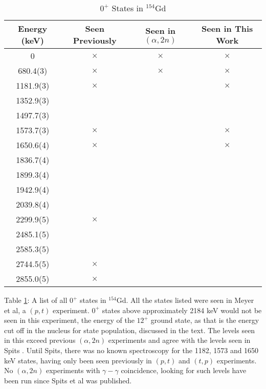 \begin{table}
    \centering
    \begin{ThreePartTable}
        \caption{$0^+$ States in $^{154}$Gd}
        \label{tab:0plus_154}
    \begin{tabular}{c|c|c|c}
        Energy (keV) & Seen Previously \citep{meyer06:_zeroplus} & Seen in $(\alpha,2n)$ & Seen in This Work  \\
        \toprule
        0 & $\times$ & $\times$ & $\times$\\
        680.4(3) & $\times$ & $\times$ & $\times$\\
        1181.9(3) & $\times$ &  & $\times$\\
        1352.9(3) & & &\\
        1497.7(3) & & &\\
        1573.7(3) & $\times$ &  & $\times$\\
        1650.6(4) & $\times$ &  & $\times$\\
        1836.7(4) & & &\\
        1899.3(4) & & &\\
        1942.9(4) & & &\\
        2039.8(4) & & &\\
        2299.9(5) & $\times$ & &\\
        2485.1(5) & & &\\
        2585.3(5) & & &\\
        2744.5(5) & $\times$ & &\\
        2855.0(5) & $\times$ & &\\
        \bottomrule
    \end{tabular}
        \begin{tablenotes}[para]
        Table \ref{tab:0plus_154}: A list of all $0^+$ states in $^{154}$Gd. All the states listed were seen in Meyer et al, a $(p,t)$ experiment\citep{meyer06:_zeroplus}. $0^+$ states above approximately 2184 keV would not be seen in this experiment, the energy of the $12^+$ ground state, as that is the energy cut off in the nucleus for state population, discussed in the text. The levels seen in this exceed previous $(\alpha,2n)$ experiments and agree with the levels seen in Spits \citep{spits96:_154gd}. Until Spits, there was no known spectroscopy for the 1182, 1573 and 1650 keV states, having only been seen previously in $(p,t)$ and $(t,p)$ experiments. No $(\alpha,2n)$ experiments with $\gamma-\gamma$ coincidence, looking for such levels have been run since Spits et al was published.
        \end{tablenotes}
\end{ThreePartTable}
\end{table}